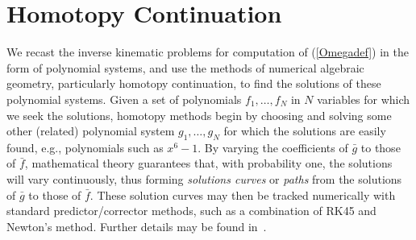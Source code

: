 \documentclass[12pt]{report}
\begin{document}
\section{Homotopy Continuation} \label{sec:bertini}

We recast the inverse kinematic problems for computation of (\ref{Omegadef}) in the form of polynomial systems, and use the  methods of numerical algebraic 
geometry, particularly homotopy continuation, to find the solutions of these polynomial systems.  Given a set of polynomials $f_1,\ldots,f_N$ in $N$ variables for which we 
seek the solutions, homotopy methods begin by choosing and solving some other (related) polynomial system $g_1,\ldots,g_N$ for which the solutions are easily found, e.g., polynomials such as $x^6-1$.  By varying the coefficients of $\bar{g}$ to those of $\bar{f}$, mathematical theory guarantees that, with probability one, the solutions will 
vary continuously, thus forming {\em solutions curves} or {\em paths} from the solutions of $\bar{g}$ to those of $\bar{f}$.  These solution curves may then be tracked numerically 
with standard predictor/corrector methods, such as a combination of RK45 and Newton's method.   Further details may be found in~\cite{AG90,SW05}.
\end{document}
